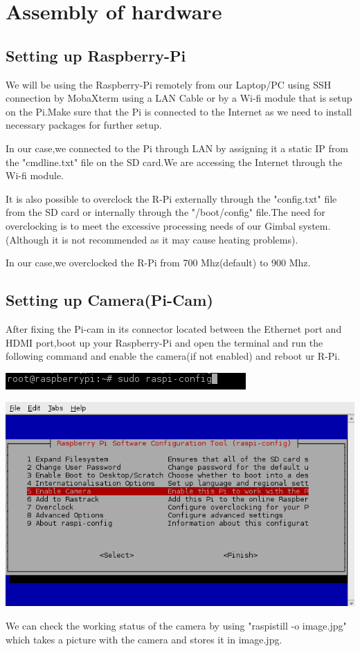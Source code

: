 \documentclass[a4paper,12pt,oneside]{book}
\begin{document}
\section{Assembly of hardware}
\subsection{Setting up Raspberry-Pi}
		\par We will be using the Raspberry-Pi remotely from our Laptop/PC using SSH connection by MobaXterm using a LAN Cable or by a Wi-fi module that is setup on the Pi.Make sure that the Pi is connected to the Internet as we need to install necessary packages for further setup.
		\par In our case,we connected to the Pi through LAN by assigning it a static IP from the "cmdline.txt" file on the SD card.We are accessing the Internet through the Wi-fi module.
		\par It is also possible to overclock the R-Pi externally through the "config.txt" file from the SD card or internally through the "/boot/config" file.The need for overclocking is to meet the excessive processing needs of our Gimbal system.(Although it is not recommended as it may cause heating problems).
		\par In our case,we overclocked the R-Pi from 700 Mhz(default) to 900 Mhz.
		
		\subsection{Setting up Camera(Pi-Cam)}
		After fixing the Pi-cam in its connector located between the Ethernet port and HDMI port,boot up your Raspberry-Pi and open the terminal and run the following command and enable the camera(if not enabled) and reboot ur R-Pi.
		\begin{center}
			\includegraphics[scale=0.6]{cmd.png}
		\end{center}
		\begin{center}
		   \includegraphics[scale=0.6]{enablecam.png}
		\end{center}
		\par We can check the working status of the camera by using "raspistill -o image.jpg" which takes a picture with the camera and stores it in image.jpg. 
	
\end{document}

